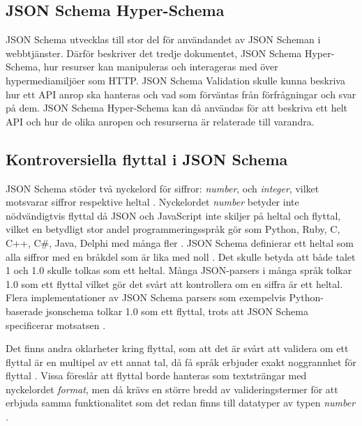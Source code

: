 \subsection{JSON Schema Hyper-Schema}
JSON Schema utvecklas till stor del för användandet av JSON Scheman i webbtjänster. Därför beskriver det tredje dokumentet, JSON Schema Hyper-Schema, hur resurser kan manipuleras och interageras med över hypermediamiljöer som HTTP. JSON Schema Validation skulle kunna beskriva hur ett API anrop ska hanteras och vad som förväntas från förfrågningar och svar på dem. JSON Schema Hyper-Schema kan då användas för att beskriva ett helt API och hur de olika anropen och resurserna är relaterade till varandra. \cite{Andrews2018a}

\subsection{Kontroversiella flyttal i JSON Schema}
\label{sec:teori:schema:float}

JSON Schema stöder två nyckelord för siffror: \textit{number}, och \textit{integer}, vilket motsvarar siffror respektive heltal \cite{Andrews}. Nyckelordet \textit{number} betyder inte nödvändigtvis flyttal då JSON och JavaScript inte skiljer på heltal och flyttal, vilket en betydligt stor andel programmeringsspråk gör som Python, Ruby, C, C++, C\#, Java, Delphi med många fler \cite{Embarcadero,Oracle,Microsofta,GNU,GNUa,Britt,Britta,PythonSoftwareFoundation2018,ECMA2013,EcmaInternational2017}. JSON Schema definierar ett heltal som alla siffror med en bråkdel som är lika med noll \cite{Andrews}. Det skulle betyda att både talet 1 och 1.0 skulle tolkas som ett heltal. Många JSON-parsers i många språk tolkar 1.0 som ett flyttal vilket gör det svårt att kontrollera om en siffra är ett heltal. Flera implementationer av JSON Schema parsers som exempelvis Python-baserade jsonschema tolkar 1.0 som ett flyttal, trots att JSON Schema specificerar motsatsen \cite{SpaceTelescopeScienceInstitute2016}.

Det finns andra oklarheter kring flyttal, som att det är svårt att validera om ett flyttal är en multipel av ett annat tal, då få språk erbjuder exakt noggrannhet för flyttal \cite{Cederqvist2017}. Vissa föreslår att flyttal borde hanteras som textsträngar med nyckelordet \textit{format}, men då krävs en större bredd av valideringstermer för att erbjuda samma funktionalitet som det redan finns till datatyper av typen \textit{number} \cite{Poberezkin,Faassen}.

